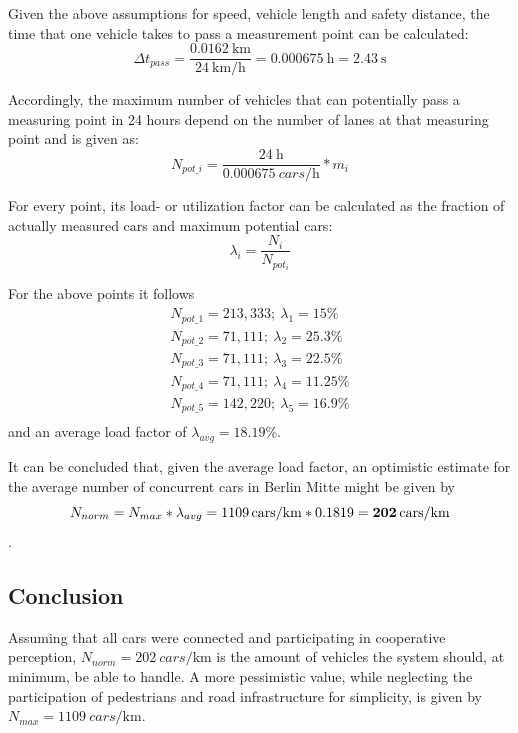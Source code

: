 Given the above assumptions for speed, vehicle length and safety distance, the time that one vehicle takes to pass a measurement point can be calculated: $$\Delta t_{pass} = \frac{\SI{0.0162}{\km}}{\SI{24}{\km\per\hour}} = \SI{0.000675}{\hour} = \SI{2.43}{\second}$$

Accordingly, the maximum number of vehicles that can potentially pass a measuring point in 24 hours depend on the number of lanes at that measuring point and is given as: $$N_{pot\_i} = \frac{\SI{24}{\hour}}{\SI{0.000675}{cars\per\hour}} * m_i$$

For every point, its load- or utilization factor can be calculated as the fraction of actually measured cars and maximum potential cars: $$\lambda_i = \frac{N_i}{N_{pot_i}}$$

For the above points it follows
\begin{gather*}
N_{pot\_1} = 213,333; \  \lambda_1 = 15 \% \\
N_{pot\_2} = 71,111; \  \lambda_2 = 25.3 \% \\
N_{pot\_3} = 71,111; \  \lambda_3 = 22.5 \% \\
N_{pot\_4} = 71,111; \  \lambda_4 = 11.25 \% \\
N_{pot\_5} = 142,220; \  \lambda_5 = 16.9 \% \\
\end{gather*}
and an average load factor of $\lambda_{avg} = 18.19 \%$.

It can be concluded that, given the average load factor, an optimistic estimate for the average number of concurrent cars in Berlin Mitte might be given by $$N_{norm} = N_{max} * \lambda_{avg} = \SI[detect-weight]{1109}{cars\per\km} * 0.1819 = \textbf{\SI[detect-weight]{202}{cars\per\km}}$$.

\subsection{Conclusion}
\label{subsec:problem_analysis:conclusion}
Assuming that all cars were connected and participating in cooperative perception, \textbf{$N_{norm} = \SI[detect-weight]{202}{cars\per\km}$} is the amount of vehicles the system should, at minimum, be able to handle. A more pessimistic value, while neglecting the participation of pedestrians and road infrastructure for simplicity, is given by \textbf{$N_{max} = \SI[detect-weight]{1109}{cars\per\km}$}.